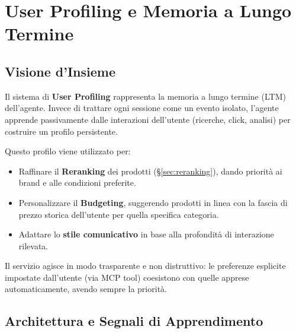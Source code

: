 
\chapter{User Profiling e Memoria a Lungo Termine}
\label{chap:user-profiling}

\section{Visione d'Insieme}
\label{sec:profiling-intro}

Il sistema di \textbf{User Profiling} rappresenta la memoria a lungo termine (LTM) dell'agente. Invece di trattare ogni sessione come un evento isolato, l'agente apprende passivamente dalle interazioni dell'utente (ricerche, click, analisi) per costruire un profilo persistente. 

Questo profilo viene utilizzato per:
\begin{itemize}
    \item Raffinare il \textbf{Reranking} dei prodotti (\S\ref{sec:reranking}), dando priorità ai brand e alle condizioni preferite.
    \item Personalizzare il \textbf{Budgeting}, suggerendo prodotti in linea con la fascia di prezzo storica dell'utente per quella specifica categoria.
    \item Adattare lo \textbf{stile comunicativo} in base alla profondità di interazione rilevata.
\end{itemize}

Il servizio agisce in modo trasparente e non distruttivo: le preferenze esplicite impostate dall'utente (via MCP tool) coesistono con quelle apprese automaticamente, avendo sempre la priorità.

\section{Architettura e Segnali di Apprendimento}
\label{sec:profiling-signals}

